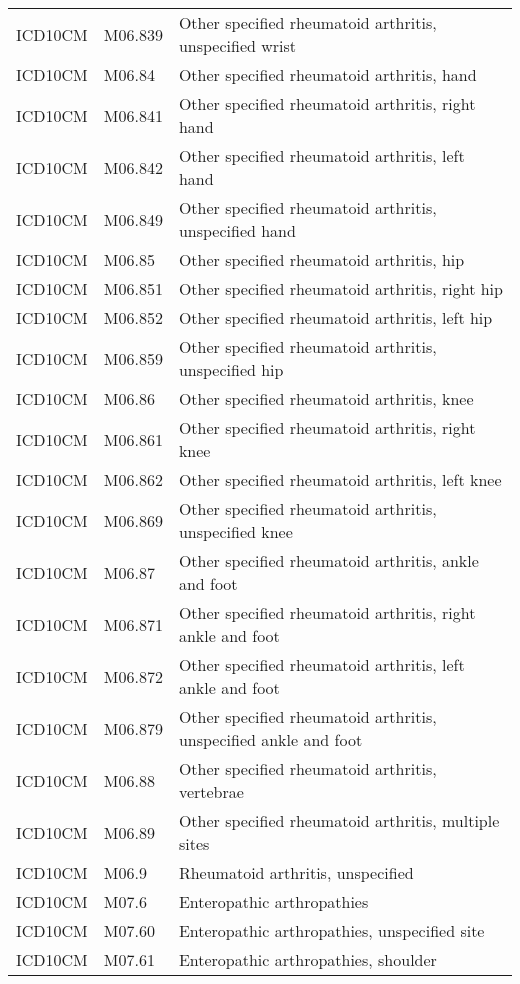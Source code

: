 \begin{table}[ht]
\begin{tabular}{lll}
  ICD10CM & M06.839 & Other specified rheumatoid arthritis, unspecified wrist \\ 
  ICD10CM & M06.84 & Other specified rheumatoid arthritis, hand \\ 
  ICD10CM & M06.841 & Other specified rheumatoid arthritis, right hand \\ 
  ICD10CM & M06.842 & Other specified rheumatoid arthritis, left hand \\ 
  ICD10CM & M06.849 & Other specified rheumatoid arthritis, unspecified hand \\ 
  ICD10CM & M06.85 & Other specified rheumatoid arthritis, hip \\ 
  ICD10CM & M06.851 & Other specified rheumatoid arthritis, right hip \\ 
  ICD10CM & M06.852 & Other specified rheumatoid arthritis, left hip \\ 
  ICD10CM & M06.859 & Other specified rheumatoid arthritis, unspecified hip \\ 
  ICD10CM & M06.86 & Other specified rheumatoid arthritis, knee \\ 
  ICD10CM & M06.861 & Other specified rheumatoid arthritis, right knee \\ 
  ICD10CM & M06.862 & Other specified rheumatoid arthritis, left knee \\ 
  ICD10CM & M06.869 & Other specified rheumatoid arthritis, unspecified knee \\ 
  ICD10CM & M06.87 & Other specified rheumatoid arthritis, ankle and foot \\ 
  ICD10CM & M06.871 & Other specified rheumatoid arthritis, right ankle and foot \\ 
  ICD10CM & M06.872 & Other specified rheumatoid arthritis, left ankle and foot \\ 
  ICD10CM & M06.879 & Other specified rheumatoid arthritis, unspecified ankle and foot \\ 
  ICD10CM & M06.88 & Other specified rheumatoid arthritis, vertebrae \\ 
  ICD10CM & M06.89 & Other specified rheumatoid arthritis, multiple sites \\ 
  ICD10CM & M06.9 & Rheumatoid arthritis, unspecified \\ 
  ICD10CM & M07.6 & Enteropathic arthropathies \\ 
  ICD10CM & M07.60 & Enteropathic arthropathies, unspecified site \\ 
  ICD10CM & M07.61 & Enteropathic arthropathies, shoulder \\ 

\end{tabular}
\end{table}

